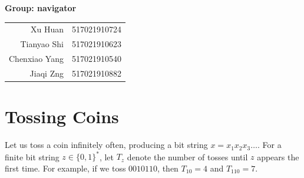 \documentclass[12pt,a4]{article}
\begin{document}
\maketitle

%
%




\setcounter{section}{2}

\begin{center}
  \large\textbf{Group: navigator} 
\end{center}
\begin{center}
  \begin{tabular}{rl}
 Xu Huan  & 517021910724 \\
 Tianyao Shi     &     517021910623 \\
Chenxiao Yang    &    517021910540  \\
Jiaqi  Zng      &     517021910882  \\
  \end{tabular}
\end{center}

\newpage


\section{Tossing Coins}

Let us toss a coin infinitely often, producing a bit string $x = x_1 x_2 x_3 \dots$. For a finite bit string $z \in \{0,1\}^*$, let $T_z$ denote the number of tosses
until $z$ appears the first time. For example, if we toss $0010110$, then $T_{10} = 4$ and
$T_{110} = 7$.
\end{document}

